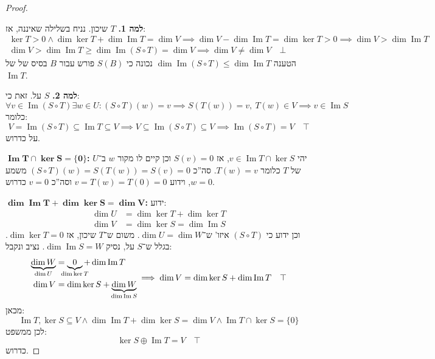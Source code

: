 \documentclass[]{article}
\DeclareMathOperator\Img   {Im}
\newcommand\co        {\colon}
\theoremstyle{definition}
\begin{document}
    \begin{proof}\,
        
        \textbf{למה 1. }$T$ שיכון. נניח בשלילה שאיננה, אז: 
        \begin{gather*}
            \ker T > 0 \land \dim \ker T + \dim \Img T = \dim V \implies \dim V - \dim \Img T = \dim \ker T > 0 \implies \dim V > \dim \Img T \\
            \dim V > \dim \Img T \ge \dim \Img (S \circ T) = \dim V \implies \dim V \neq \dim V \quad \bot 
        \end{gather*}
        הטענה $\dim \Img (S \circ T) \le \dim \Img T$ נכונה כי $S(B)$ פורש עבור $B$ בסיס של של $\Img T$. 
        
        \textbf{למה 2. }$S$ על. זאת כי: 
        \[ \forall v \in \Img (S \circ T) \exists w \in U \co (S \circ T)(w) = v \implies S(T(w)) = v, \ T(w) \in V \implies v \in \Img S \]
        כלומר: 
        \[ V = \Img (S \circ T) \subseteq \Img T \subseteq V \implies V \subseteq \Img (S \circ T) \subseteq V \implies \Img (S \circ T) = V \quad \top \]
        על כדרוש. 
        
        $\bm{\Img T \cap \ker S = \{0\}}$\textbf{: }יהי $v \in \Img T \cap \ker S$, אז $S(v) = 0$ וכן קיים לו מקור $w$ ב־$U$ של $T$ כלומר $T(w) = v$. סה''כ $(S \circ T)(w) = S(T(w)) = S(v) = 0$ משמע $w = 0$, וידוע $v = T(w) = T(0) = 0$ וסה''כ $v = 0$ כדרוש. 
        
        $\bm{\dim \Img T + \dim \ker S = \dim V}$\textbf{: }ידוע: 
        \[ \begin{aligned}
            \dim U &= \dim \ker T + \dim \ker T \\
            \dim V &= \dim \ker S = \dim \Img S
        \end{aligned} \]
        וכן ידוע כי $(S \circ T)$ איזו' ש־$\dim U = \dim W$. 
        משום ש־$T$ שיכון, אז $\dim \ker T = 0$. בגלל ש־$S$ על, נסיק $\dim \Img S = W$. נציב ונקבל: 
        \[ \begin{aligned}
            \underbrace{\dim W}_{\mathclap{\dim U}} &= \underbrace{0}_{\mathclap{\dim \ker T}} + \dim \Img T \\
            \dim V &= \dim \ker S + \underbrace{\dim W}_{\mathclap{\dim \Img S}}
        \end{aligned} \implies \dim V = \dim \ker S + \dim \Img T \quad \top \]
        מכאן: 
        \[ \Img T, \ker S \subseteq V \land \dim \Img T + \dim \ker S = \dim V \land \Img T \cap \ker S = \{0\} \]
        לכן ממשפט: 
        \[ \ker S \oplus \Img T = V \quad \top \]
        כדרוש. 
    \end{proof}
    
\end{document}
